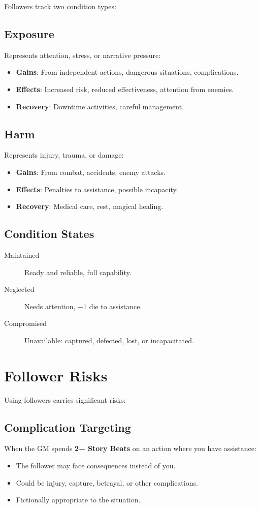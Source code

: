 Followers track two condition types:

\subsection*{Exposure}
Represents attention, stress, or narrative pressure:
\begin{itemize}
\item \textbf{Gains}: From independent actions, dangerous situations, complications.
\item \textbf{Effects}: Increased risk, reduced effectiveness, attention from enemies.
\item \textbf{Recovery}: Downtime activities, careful management.
\end{itemize}

\subsection*{Harm}
Represents injury, trauma, or damage:
\begin{itemize}
\item \textbf{Gains}: From combat, accidents, enemy attacks.
\item \textbf{Effects}: Penalties to assistance, possible incapacity.
\item \textbf{Recovery}: Medical care, rest, magical healing.
\end{itemize}

\subsection*{Condition States}
\begin{description}
\item[Maintained] Ready and reliable, full capability.
\item[Neglected] Needs attention, $-1$ die to assistance.
\item[Compromised] Unavailable: captured, defected, lost, or incapacitated.
\end{description}

\section{Follower Risks}

Using followers carries significant risks:

\subsection*{Complication Targeting}
When the GM spends \textbf{2+ Story Beats} on an action where you have assistance:
\begin{itemize}
\item The follower may face consequences instead of you.
\item Could be injury, capture, betrayal, or other complications.
\item Fictionally appropriate to the situation.
\end{itemize}

